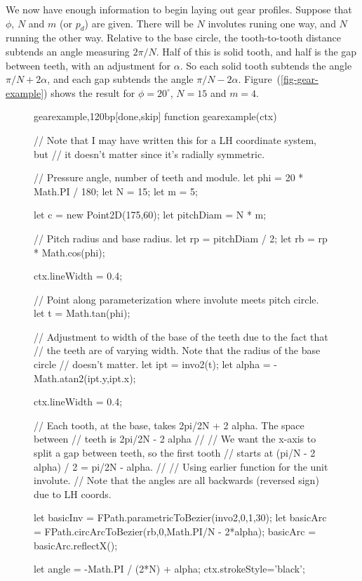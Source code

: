 \documentclass[10pt]{article}
\begin{document}
We now have enough information to begin laying out gear
profiles. Suppose that $\phi$, $N$ and $m$ (or $p_d$) are given. There
will be $N$ involutes runing one way, and $N$ running the other
way. Relative to the base circle, the tooth-to-tooth distance subtends
an angle measuring $2\pi/N$. Half of this is solid tooth, and half is the
gap between teeth, with an adjustment for $\alpha$. So each solid
tooth subtends the angle $\pi/N + 2\alpha$, and each gap
subtends the angle $\pi/N - 2\alpha$. Figure~(\ref{fig-gear-example})
shows the result for $\phi = 20^\circ$, $N=15$ and $m =4$. 

\begin{figure}
\begin{figput}{gearexample,120bp}[done,skip]
function gearexample(ctx) {

  // Note that I may have written this for a LH coordinate system, but
  // it doesn't matter since it's radially symmetric.
  
  // Pressure angle, number of teeth and module.
  let phi = 20 * Math.PI / 180;
  let N = 15;
  let m = 5;

  let c = new Point2D(175,60);
  let pitchDiam = N * m;

  // Pitch radius and base radius.
  let rp = pitchDiam / 2;
  let rb = rp * Math.cos(phi);

  ctx.lineWidth = 0.4;

  // Point along parameterization where involute meets pitch circle.
  let t = Math.tan(phi);

  // Adjustment to width of the base of the teeth due to the fact that
  // the teeth are of varying width. Note that the radius of the base circle
  // doesn't matter.
  let ipt = invo2(t);
  let alpha = -Math.atan2(ipt.y,ipt.x);

  ctx.lineWidth = 0.4;

  // Each tooth, at the base, takes 2pi/2N + 2 alpha. The space between
  // teeth is 2pi/2N - 2 alpha
  //
  // We want the x-axis to split a gap between teeth, so the first tooth
  // starts at (pi/N - 2 alpha) / 2 = pi/2N - alpha.
  //
  // Using earlier function for the unit involute.
  // Note that the angles are all backwards (reversed sign) due to LH coords.
  
  let basicInv = FPath.parametricToBezier(invo2,0,1,30);
  let basicArc = FPath.circArcToBezier(rb,0,Math.PI/N - 2*alpha);
  basicArc = basicArc.reflectX();

  let angle = -Math.PI / (2*N) + alpha;
  ctx.strokeStyle='black';

}
\end{figput}
\end{figure}
\end{document}
